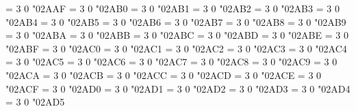 \Umathchardef\preceq = 3 0 "02AAF %
\Umathchardef\succeq = 3 0 "02AB0 %
\Umathchardef\precneq = 3 0 "02AB1 %
\Umathchardef\succneq = 3 0 "02AB2 %
\Umathchardef\preceqq = 3 0 "02AB3 %
\Umathchardef\succeqq = 3 0 "02AB4 %
\Umathchardef\precneqq = 3 0 "02AB5 %
\Umathchardef\succneqq = 3 0 "02AB6 %
\Umathchardef\precapprox = 3 0 "02AB7 %
\Umathchardef\succapprox = 3 0 "02AB8 %
\Umathchardef\precnapprox = 3 0 "02AB9 %
\Umathchardef\succnapprox = 3 0 "02ABA %
\Umathchardef\Prec = 3 0 "02ABB %
\Umathchardef\Succ = 3 0 "02ABC %
\Umathchardef\subsetdot = 3 0 "02ABD %
\Umathchardef\supsetdot = 3 0 "02ABE %
\Umathchardef\subsetplus = 3 0 "02ABF %
\Umathchardef\supsetplus = 3 0 "02AC0 %
\Umathchardef\submult = 3 0 "02AC1 %
\Umathchardef\supmult = 3 0 "02AC2 %
\Umathchardef\subedot = 3 0 "02AC3 %
\Umathchardef\supedot = 3 0 "02AC4 %
\Umathchardef\subseteqq = 3 0 "02AC5 %
\Umathchardef\supseteqq = 3 0 "02AC6 %
\Umathchardef\subsim = 3 0 "02AC7 %
\Umathchardef\supsim = 3 0 "02AC8 %
\Umathchardef\subsetapprox = 3 0 "02AC9 %
\Umathchardef\supsetapprox = 3 0 "02ACA %
\Umathchardef\subsetneqq = 3 0 "02ACB %
\Umathchardef\supsetneqq = 3 0 "02ACC %
\Umathchardef\lsqhook = 3 0 "02ACD %
\Umathchardef\rsqhook = 3 0 "02ACE %
\Umathchardef\csub = 3 0 "02ACF %
\Umathchardef\csup = 3 0 "02AD0 %
\Umathchardef\csube = 3 0 "02AD1 %
\Umathchardef\csupe = 3 0 "02AD2 %
\Umathchardef\subsup = 3 0 "02AD3 %
\Umathchardef\supsub = 3 0 "02AD4 %
\Umathchardef\subsub = 3 0 "02AD5 %
